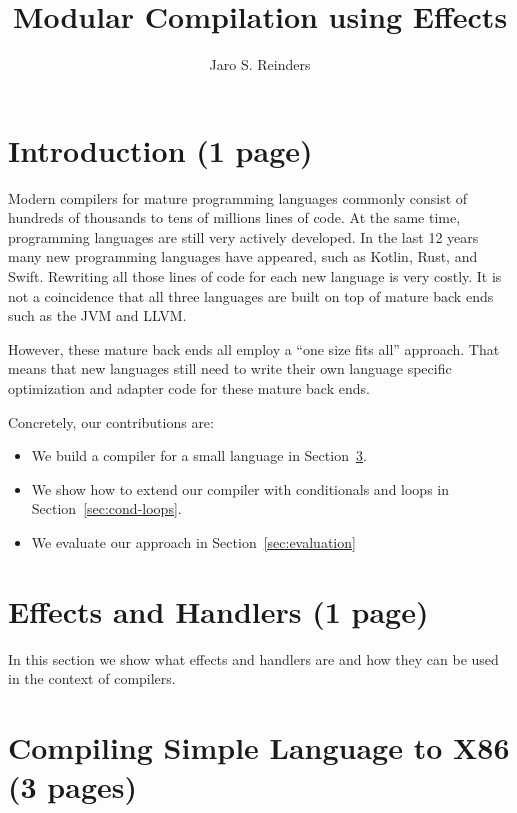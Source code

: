 \documentclass[sigplan,anonymous,review]{acmart}
\title{Modular Compilation using Effects}
\author{Jaro S. Reinders} %
\begin{document}
\begin{abstract}

\end{abstract}

\maketitle

\section{Introduction (1 page)} \label{sec:intro}

Modern compilers for mature programming languages commonly consist of hundreds of thousands to tens of millions lines of code.
At the same time, programming languages are still very actively developed.
In the last 12 years many new programming languages have appeared, such as Kotlin, Rust, and Swift.
Rewriting all those lines of code for each new language is very costly.
It is not a coincidence that all three languages are built on top of mature back ends such as the JVM and LLVM.

However, these mature back ends all employ a ``one size fits all'' approach.
That means that new languages still need to write their own language specific optimization and adapter code for these mature back ends.


Concretely, our contributions are:
\begin{itemize}
  \item We build a compiler for a small language in Section~\ref{sec:simple-lang}.
  \item We show how to extend our compiler with conditionals and loops in Section~\ref{sec:cond-loops}.
  \item We evaluate our approach in Section~\ref{sec:evaluation}
\end{itemize}

\section{Effects and Handlers (1 page)} \label{sec:effects-handlers}

In this section we show what effects and handlers are and how they can be used in the context of compilers.

\section{Compiling Simple Language to X86 (3 pages)} \label{sec:simple-lang}
\end{document}
